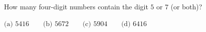 How many four-digit numbers contain the digit $5$ or $7$ (or both)?



$\text{(a) }5416\qquad\text{(b) }5672\qquad\text{(c) }5904\qquad\text{(d) }6416$




